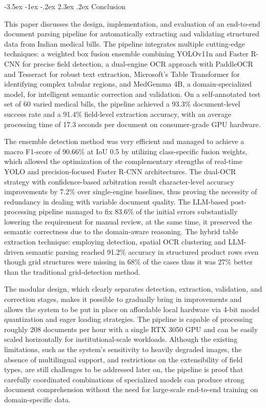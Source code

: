\documentclass[conference,twocolumn]{IEEEtran}
\makeatletter
\renewcommand{\section}{\@startsection{section}{1}{\z@}%
  {-3.5ex \@plus -1ex \@minus -.2ex}%
  {2.3ex \@plus.2ex}%
  {\normalfont\large\bfseries\centering}}
\makeatother
\begin{document}
\section{Conclusion}

This paper discusses the design, implementation, and evaluation of an
end-to-end document parsing pipeline for automatically extracting and
validating structured data from Indian medical bills. The pipeline
integrates multiple cutting-edge techniques: a weighted box fusion
ensemble combining YOLOv11n and Faster R-CNN for precise field
detection, a dual-engine OCR approach with PaddleOCR and Tesseract for
robust text extraction, Microsoft's Table Transformer
for identifying complex tabular regions, and MedGemma 4B, a
domain-specialized model, for intelligent semantic correction and
validation. On a self-annotated test set of 60 varied medical bills, the
pipeline achieved a 93.3\% document-level success rate and a 91.4\%
field-level extraction accuracy, with an average processing time of 17.3
seconds per document on consumer-grade GPU hardware.

The ensemble detection method was very efficient and managed to achieve
a macro F1-score of 90.66\% at IoU 0.5 by utilizing class-specific
fusion weights, which allowed the optimization of the complementary
strengths of real-time YOLO and precision-focused Faster R-CNN
architectures. The dual-OCR strategy with confidence-based arbitration
result character-level accuracy improvements by 7.2\% over single-engine
baselines, thus proving the necessity of redundancy in dealing with
variable document quality. The LLM-based post-processing pipeline
managed to fix 83.6\% of the initial errors substantially lowering the
requirement for manual review, at the same time, it preserved the
semantic correctness due to the domain-aware reasoning. The hybrid table
extraction technique: employing detection, spatial OCR clustering and
LLM-driven semantic parsing reached 91.2\% accuracy in structured
product rows even though grid structures were missing in 68\% of the
cases thus it was 27\% better than the traditional grid-detection
method.

The modular design, which clearly separates detection, extraction,
validation, and correction stages, makes it possible to gradually bring
in improvements and allows the system to be put in place on affordable
local hardware via 4-bit model quantization and eager loading
strategies. The pipeline is capable of processing roughly 208 documents
per hour with a single RTX 3050 GPU and can be easily scaled
horizontally for institutional-scale workloads. Although the existing
limitations, such as the system's sensitivity to heavily
degraded images, the absence of multilingual support, and restrictions
on the extensibility of field types, are still challenges to be
addressed later on, the pipeline is proof that carefully coordinated
combinations of specialized models can produce strong document
comprehension without the need for large-scale end-to-end training on
domain-specific data.
\end{document}
